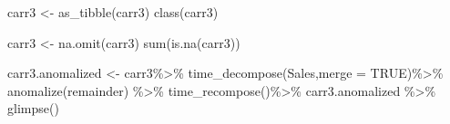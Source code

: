\documentclass[
]{article}
\newenvironment{Shaded}{\begin{snugshade}}{\end{snugshade}}
\newcommand{\AttributeTok}[1]{\textcolor[rgb]{0.77,0.63,0.00}{#1}}
\newcommand{\ConstantTok}[1]{\textcolor[rgb]{0.00,0.00,0.00}{#1}}
\newcommand{\FunctionTok}[1]{\textcolor[rgb]{0.00,0.00,0.00}{#1}}
\newcommand{\NormalTok}[1]{#1}
\newcommand{\OtherTok}[1]{\textcolor[rgb]{0.56,0.35,0.01}{#1}}
\newcommand{\SpecialCharTok}[1]{\textcolor[rgb]{0.00,0.00,0.00}{#1}}
\newcommand{\StringTok}[1]{\textcolor[rgb]{0.31,0.60,0.02}{#1}}
\begin{document}
\begin{Shaded}
\begin{Highlighting}[]
\NormalTok{carr3 }\OtherTok{\textless{}{-}} \FunctionTok{as\_tibble}\NormalTok{(carr3)}
\FunctionTok{class}\NormalTok{(carr3)}
\end{Highlighting}
\end{Shaded}

\begin{Shaded}
\end{Shaded}

\begin{Shaded}
\end{Shaded}

\begin{Shaded}
\end{Shaded}

\begin{Shaded}
\begin{Highlighting}[]
\NormalTok{carr3 }\OtherTok{\textless{}{-}} \FunctionTok{na.omit}\NormalTok{(carr3)}
\FunctionTok{sum}\NormalTok{(}\FunctionTok{is.na}\NormalTok{(carr3))}
\end{Highlighting}
\end{Shaded}

\begin{Shaded}
\begin{Highlighting}[]
\NormalTok{carr3.anomalized }\OtherTok{\textless{}{-}}\NormalTok{ carr3}\SpecialCharTok{\%\textgreater{}\%}
  \FunctionTok{time\_decompose}\NormalTok{(Sales,}\AttributeTok{merge =} \ConstantTok{TRUE}\NormalTok{)}\SpecialCharTok{\%\textgreater{}\%}
  \FunctionTok{anomalize}\NormalTok{(remainder) }\SpecialCharTok{\%\textgreater{}\%} 
  \FunctionTok{time\_recompose}\NormalTok{()}\SpecialCharTok{\%\textgreater{}\%}
\NormalTok{carr3.anomalized }\SpecialCharTok{\%\textgreater{}\%} \FunctionTok{glimpse}\NormalTok{()}
\end{Highlighting}
\end{Shaded}
\end{document}
